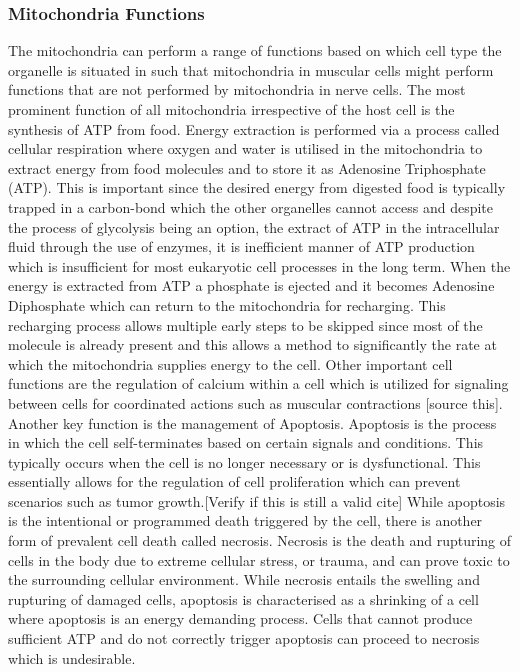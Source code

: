 \subsubsection{Mitochondria Functions} %
The mitochondria can perform a range of functions based on which cell type the organelle is situated in such that mitochondria in muscular cells might perform functions that are not performed by mitochondria in nerve cells. The most prominent function of all mitochondria irrespective of the host cell is the synthesis of ATP from food. Energy extraction is performed via a process called cellular respiration where oxygen and water is utilised in the mitochondria to extract energy from food molecules and to store it as Adenosine Triphosphate (ATP). This is important since the desired energy from digested food is typically trapped in a carbon-bond which the other organelles cannot access and despite the process of glycolysis being an option, the extract of ATP in the intracellular fluid through the use of enzymes, it is inefficient manner of ATP production which is insufficient for most eukaryotic cell processes in the long term. When the energy is extracted from ATP a phosphate is ejected and it becomes Adenosine Diphosphate which can return to the mitochondria for recharging. This recharging process allows multiple early steps to be skipped since most of the molecule is already present and this allows a method to significantly the rate at which the mitochondria supplies energy to the cell.\cite{introPhys-2013} \newline\newline Other important cell functions are the regulation of calcium within a cell which is utilized for signaling between cells for coordinated actions such as muscular contractions [source this]. Another key function is the management of Apoptosis. Apoptosis is the process in which the cell self-terminates based on certain signals and conditions. This typically occurs when the cell is no longer necessary or is dysfunctional. This essentially allows for the regulation of cell proliferation which can prevent scenarios such as tumor growth.[Verify if this is still a valid cite]\cite{Apopt-2009} While apoptosis is the intentional or programmed death triggered by the cell, there is another form of prevalent cell death called necrosis. Necrosis is the death and rupturing of cells in the body due to extreme cellular stress, or trauma, and can prove toxic to the surrounding cellular environment. While necrosis entails the swelling and rupturing of damaged cells, apoptosis is characterised as a shrinking of a cell where apoptosis is an energy demanding process. Cells that cannot produce sufficient ATP and do not correctly trigger apoptosis can proceed to necrosis which is undesirable.\cite{introPhys-2013}  
